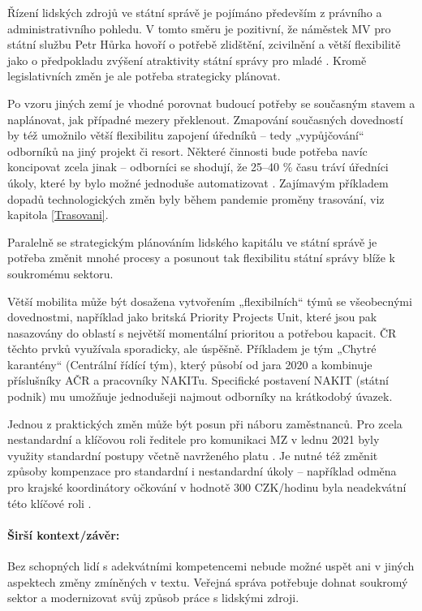 Řízení lidských zdrojů ve státní správě je pojímáno především z právního a administrativního pohledu. V tomto směru je pozitivní, že náměstek MV pro státní službu Petr Hůrka \cite{plihalova_z_2020} hovoří o potřebě zlidštění, zcivilnění a větší flexibilitě jako o předpokladu zvýšení atraktivity státní správy pro mladé \cite{mpo2021}. Kromě legislativních změn je ale potřeba strategicky plánovat.

Po vzoru jiných zemí \cite{thomas_finding_2021, ministere_gestion_2015} je vhodné porovnat budoucí potřeby se současným stavem a naplánovat, jak případné mezery překlenout. Zmapování současných dovedností by též umožnilo větší flexibilitu zapojení úředníků -- tedy „vypůjčování“ odborníků na jiný projekt či resort. Některé činnosti bude potřeba navíc koncipovat zcela jinak -- odborníci se shodují, že 25--40 \% času tráví úředníci úkoly, které by bylo možné jednoduše automatizovat \cite{department_of_the_prime_minister_and_cabinet_our_2019, deloitte_augmented_2017}. Zajímavým příkladem dopadů technologických změn byly během pandemie proměny trasování, viz kapitola \ref{Trasovani}.

Paralelně se strategickým plánováním lidského kapitálu ve státní správě je potřeba změnit mnohé procesy a posunout tak flexibilitu státní správy blíže k soukromému sektoru.

Větší mobilita může být dosažena vytvořením „flexibilních“ týmů se všeobecnými dovednostmi, například jako britská Priority Projects Unit, které jsou pak nasazovány do oblastí s největší momentální prioritou a potřebou kapacit. ČR těchto prvků využívala sporadicky, ale úspěšně. Příkladem je tým „Chytré karantény“ (Centrální řídící tým), který působí od jara 2020 a kombinuje příslušníky AČR a pracovníky NAKITu. Specifické postavení NAKIT (státní podnik) mu umožňuje jednodušeji najmout odborníky na krátkodobý úvazek.

Jednou z praktických změn může být posun při náboru zaměstnanců. Pro zcela nestandardní a klíčovou roli ředitele pro komunikaci MZ v lednu 2021 byly využity standardní postupy včetně navrženého platu \cite{irozhlas_ministerstvo_2021}. Je nutné též změnit způsoby kompenzace pro standardní i nestandardní úkoly -- například odměna pro krajské koordinátory očkování v hodnotě 300 CZK/hodinu byla neadekvátní této klíčové roli \cite{michal_blaha_pandemie_2021}.

\paragraph{Širší kontext/závěr:} Bez schopných lidí s adekvátními kompetencemi nebude možné uspět ani v jiných aspektech změny zmíněných v textu. Veřejná správa potřebuje dohnat soukromý sektor a modernizovat svůj způsob práce s lidskými zdroji.

